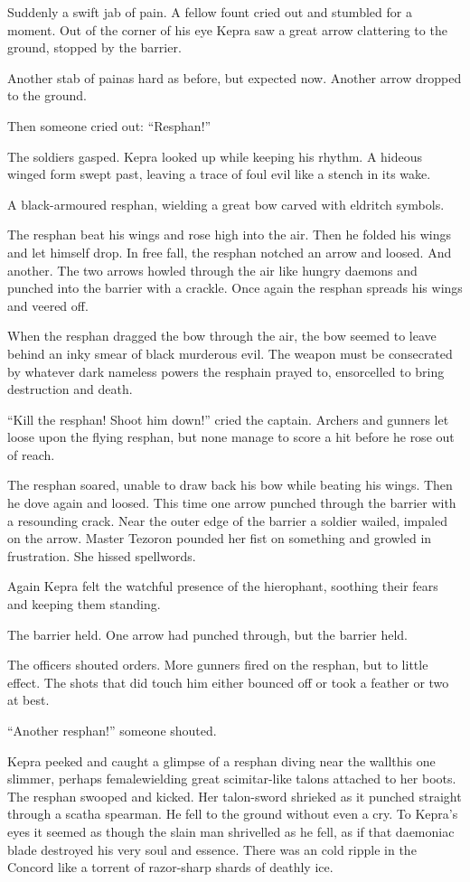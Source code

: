 \documentclass
  [a4paper,
   12pt,
   oneside
  ]%
  {article}
\begin{document}
Suddenly a swift jab of pain. A fellow fount cried out and stumbled for a moment. Out of the corner of his eye Kepra saw a great arrow clattering to the ground, stopped by the barrier. 

Another stab of pain\dash{}as hard as before, but expected now. Another arrow dropped to the ground.

Then someone cried out: ``Resphan!''

The soldiers gasped. Kepra looked up while keeping his rhythm. A hideous winged form swept past, leaving a trace of foul evil like a stench in its wake. 

A black-armoured resphan, wielding a great bow carved with eldritch symbols. 

The resphan beat his wings and rose high into the air. Then he folded his wings and let himself drop. In free fall, the resphan notched an arrow and loosed. And another. The two arrows howled through the air like hungry daemons and punched into the barrier with a crackle. Once again the resphan spreads his wings and veered off.

When the resphan dragged the bow through the air, the bow seemed to leave behind an inky smear of black murderous evil. 
The weapon must be consecrated by whatever dark nameless powers the resphain prayed to, ensorcelled to bring destruction and death.

``Kill the resphan! Shoot him down!'' cried the captain. Archers and gunners let loose upon the flying resphan, but none manage to score a hit before he rose out of reach. 

The resphan soared, unable to draw back his bow while beating his wings. 
Then he dove again and loosed. This time one arrow punched through the barrier with a resounding crack. 
Near the outer edge of the barrier a soldier wailed, impaled on the arrow. Master Tezoron pounded her fist on something and growled in frustration. She hissed spellwords. 

Again Kepra felt the watchful presence of the hierophant, soothing their fears and keeping them standing.

The barrier held. One arrow had punched through, but the barrier held. 

The officers shouted orders. More gunners fired on the resphan, but to little effect. The shots that did touch him either bounced off or took a feather or two at best.

``Another resphan!'' someone shouted. 

Kepra peeked and caught a glimpse of a resphan diving near the wall\dash{}this one slimmer, perhaps female\dash{}wielding great scimitar-like talons attached to her boots.
The resphan swooped and kicked. Her talon-sword shrieked as it punched straight through a scatha spearman. 
He fell to the ground without even a cry. 
To Kepra’s eyes it seemed as though the slain man shrivelled as he fell, as if that daemoniac blade destroyed his very soul and essence. There was an cold ripple in the Concord like a torrent of razor-sharp shards of deathly ice. 
\end{document}
